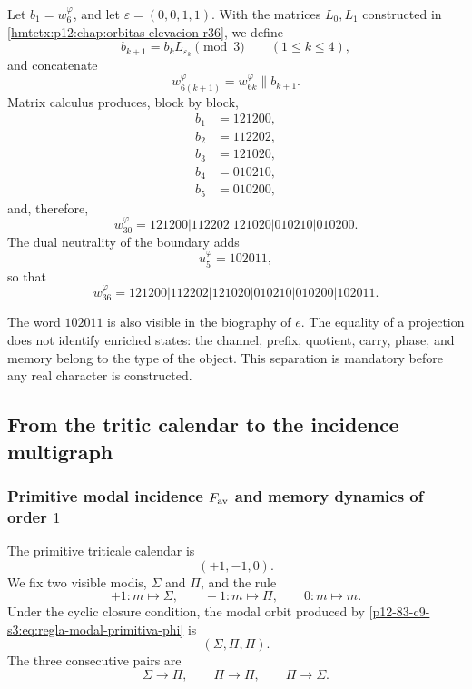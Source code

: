 Let \(b_1=w_6^{\varphi}\), and let
\(\varepsilon=(0,0,1,1)\). With the matrices \(L_0,L_1\) constructed in
\cref{hmtctx:p12:chap:orbitas-elevacion-r36}, we define
\[
 b_{k+1}=b_kL_{\varepsilon_k}\pmod3
 \qquad(1\leq k\leq4),
\]
and concatenate
\[
 w_{6(k+1)}^{\varphi}=w_{6k}^{\varphi}\mathbin{\|}b_{k+1}.
\]
Matrix calculus produces, block by block,
\[
\begin{aligned}
 b_1&=121200,\\
 b_2&=112202,\\
 b_3&=121020,\\
 b_4&=010210,\\
 b_5&=010200,
\end{aligned}
\]
and, therefore,
\begin{equation}
 \boxed{
 w_{30}^{\varphi}
 =121200|112202|121020|010210|010200.}
 \label{p12-83-c9-s3:eq:w30-phi}
\end{equation}
The dual neutrality of the boundary adds
\[
 u_5^{\varphi}=102011,
\]
so that
\begin{equation}
 \boxed{
 w_{36}^{\varphi}
 =121200|112202|121020|010210|010200|102011.}
 \label{p12-83-c9-s3:eq:w36-phi}
\end{equation}

\begin{remark}
The word \(102011\) is also visible in the biography of \(e\). The
equality of a projection does not identify enriched states: the channel,
prefix, quotient, carry, phase, and memory belong to the type of the
object. This separation is mandatory before any
real character is constructed.
\end{remark}

\subsection{From the tritic calendar to the incidence multigraph}

\subsubsection{Primitive modal incidence \(F_{\rm av}\) and memory dynamics of order \(1\)}

The primitive triticale calendar is
\[
 (+1,-1,0).
\]
We fix two visible modis, \(\Sigma\) and \(\Pi\), and the rule
\begin{equation}
 +1:m\longmapsto\Sigma,
 \qquad
 -1:m\longmapsto\Pi,
 \qquad
 0:m\longmapsto m.
 \label{p12-83-c9-s3:eq:regla-modal-primitiva-phi}
\end{equation}
Under the cyclic closure condition, the modal orbit produced by
\eqref{p12-83-c9-s3:eq:regla-modal-primitiva-phi} is
\[
 \boxed{(\Sigma,\Pi,\Pi).}
\]
The three consecutive pairs are
\[
 \Sigma\longrightarrow\Pi,
 \qquad
 \Pi\longrightarrow\Pi,
 \qquad
 \Pi\longrightarrow\Sigma.
\]

